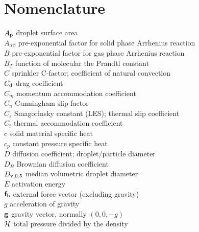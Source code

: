 
\chapter{Nomenclature}
\label{nomenclature}

\begin{tabbing}
$A_{\rm p}$ \hspace{1in}  \= droplet surface area \\
$A_{\alpha\beta}$         \> pre-exponential factor for solid phase Arrhenius reaction \\
$B$                       \> pre-exponential factor for gas phase Arrhenius reaction \\
$B_T$                     \> function of molecular the Prandtl constant \\
$C$                       \> sprinkler C-factor; coefficient of natural convection \\
$C_{\rm d}$               \> drag coefficient \\
$C_m$                     \> momentum accommodation coefficient \\
$C_n$                     \> Cunningham slip factor \\
$C_s$                     \> Smagorinsky constant (LES); thermal slip coefficient  \\
$C_t$                     \> thermal accommodation coefficient \\
$c$                       \> solid material specific heat \\
$c_p$                     \> constant pressure specific heat \\
$D$                       \> diffusion coefficient; droplet/particle diameter   \\
$D_B$                     \> Brownian diffusion coefficient \\
$D_{\rm v,0.5}$           \> median volumetric droplet diameter \\
$E$                       \> activation energy \\
${\bf f}_{\rm b}$            \> external force vector (excluding gravity) \\
$g$                       \> acceleration of gravity \\
${\bf g}$                     \> gravity vector, normally $(0,0,-g)$ \\
$\cal H$                  \> total pressure divided by the density \\

\end{tabbing}
